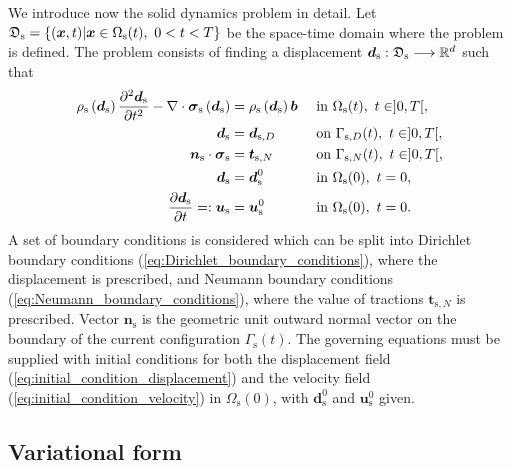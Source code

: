 \documentclass[11pt,english]{article}
\def\Omegasolid{\Omega_{\rm{s}}}
\def\x{\boldsymbol{x}}
\begin{document}
We introduce now the solid dynamics problem in detail. Let $\mathfrak{D}_{\rm{s}} =\{(\x,t)\vert\x \in\Omegasolid(t),~0<t<T\}$ be the space-time domain where the problem is defined. The problem consists of finding a displacement $\boldsymbol{d}_{\mathrm{s}}:\mathfrak{D}_{\rm{s}}\longrightarrow {\mathbb R}^d$ such that
\begin{align}
    \rho_\mathrm{s}\left(\boldsymbol{d}_{\mathrm{s}}\right)\frac{\partial^{2}\boldsymbol{d}_{\mathrm{s}}}{\partial t^2} -\nabla \cdot \boldsymbol{\sigma}_{\mathrm{s}}\left(\boldsymbol{d}_{\mathrm{s}}\right) &= \rho_{\mathrm{s}}\left(\boldsymbol{d}_{\mathrm{s}}\right) \boldsymbol{b} && \text{ in } \ensuremath{\Omega}_{\rm{s}}(t), ~t\in]0,T[,\label{eq:strong_form_of_the_problem}\\
    \boldsymbol{d}_{\mathrm{s}} &= \boldsymbol{d}_{\mathrm{s},D}  &&\text{ on } \Gamma_{\mathrm{s},D}(t),~t\in]0,T[,\label{eq:Dirichlet_boundary_conditions}\\
    \boldsymbol{n}_\mathrm{s}\cdot\boldsymbol{\sigma}_\mathrm{s} &= \boldsymbol{t}_{\mathrm{s},N}  &&\text{ on } \Gamma_{\mathrm{s},N}(t), ~t\in]0,T[,
    \label{eq:Neumann_boundary_conditions} \\
    \boldsymbol{d}_{\mathrm{s}} &= \boldsymbol{d}_{\mathrm{s}}^0 &&\text{ in } \ensuremath{\Omega}_{\rm{s}}(0),~t=0, \label{eq:initial_condition_displacement} \\
    \frac{\partial\boldsymbol{d}_{\mathrm{s}}}{\partial t} =: \boldsymbol{u}_{\mathrm{s}} &= \boldsymbol{u}_{\mathrm{s}}^0&&\text{ in } \ensuremath{\Omega}_{\rm{s}}(0),~t=0.\label{eq:initial_condition_velocity}
\end{align}
A set of boundary conditions is considered which can be split into Dirichlet boundary conditions (\ref{eq:Dirichlet_boundary_conditions}), where the displacement is prescribed, and Neumann boundary conditions (\ref{eq:Neumann_boundary_conditions}), where the value of tractions $\boldsymbol{t}_{\mathrm{s},N}$ is prescribed. Vector $\boldsymbol{n}_\mathrm{s}$ is the geometric unit outward normal vector on the boundary of the current configuration $\Gamma_\mathrm{s}(t)$.
The governing equations must be supplied with initial conditions for both the displacement field (\ref{eq:initial_condition_displacement}) and the velocity field (\ref{eq:initial_condition_velocity}) in $\Omega_{\mathrm{s}}(0)$, with $\boldsymbol{d}_{\mathrm{s}}^0$ and $\boldsymbol{u}_{\mathrm{s}}^0$ given.

\subsection{Variational form} 
\end{document}
